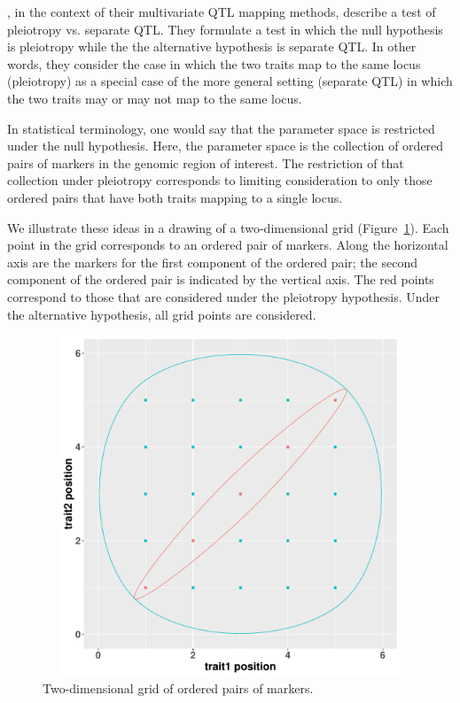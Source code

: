 \documentclass[oneside]{book}\usepackage[]{graphicx}\usepackage[]{color}
\newenvironment{knitrout}{}{} %
\begin{document}
\citet{jiang1995multiple}, in the context of their multivariate QTL mapping methods, 
describe a test of pleiotropy vs. separate QTL. 
They formulate a test in which the null hypothesis
is pleiotropy while the the alternative hypothesis is separate QTL.
In other words, they consider the case in which the two traits map to the same locus
(pleiotropy) as a special case of the more general setting (separate QTL)
in which the two traits may or may not map to the same locus.

In statistical terminology, one would say that the parameter space is restricted under the null hypothesis. Here, the parameter space is the collection of ordered pairs of markers in the genomic region of interest. The restriction of that collection under pleiotropy corresponds to limiting consideration to only those ordered pairs that have both traits mapping to a single locus. 

We illustrate these ideas in a drawing of a two-dimensional grid (Figure~\ref{fig:encircle}). Each point in the grid corresponds to an ordered pair of markers. Along the horizontal axis are the markers for the first component of the ordered pair; the second component of the ordered pair is indicated by the vertical axis. The red points correspond to those that are considered under the pleiotropy hypothesis. Under the alternative hypothesis, all grid points are considered. 




\begin{knitrout}
\color{fgcolor}\begin{figure}
\includegraphics[width=6in,height=4in]{figure/encircle-1} \caption[Two-dimensional grid of ordered pairs of markers]{Two-dimensional grid of ordered pairs of markers.}\label{fig:encircle}
\end{figure}


\end{knitrout}
\end{document}
